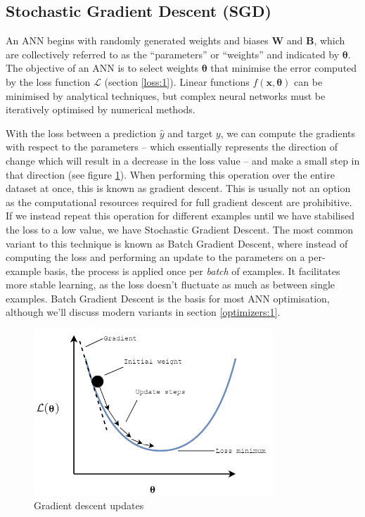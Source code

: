 \documentclass{report}
\begin{document}
\subsection{Stochastic Gradient Descent (SGD)} \label{sgd:1}
An ANN begins with randomly generated weights and biases $\bm{W}$ and $\bm{B}$, which are collectively referred to as the ``parameters'' or ``weights'' and indicated by $\bm{\theta}$. The objective of an ANN is to select weights $\bm{\theta}$ that minimise the error computed by the loss function $\mathcal{L}$ (section \ref{loss:1}). Linear functions $f(\bm{x}, \bm{\theta})$ can be minimised by analytical techniques, but complex neural networks must be iteratively optimised by numerical methods. \par
With the loss between a prediction $\hat{y}$ and target $y$, we can compute the gradients with respect to the parameters -- which essentially represents the direction of change which will result in a decrease in the loss value -- and make a small step in that direction (see figure \ref{fig:grad-descent:1}). When performing this operation over the entire dataset at once, this is known as gradient descent. This is usually not an option as the computational resources required for full gradient descent are prohibitive. If we instead repeat this operation for different examples until we have stabilised the loss to a low value, we have Stochastic Gradient Descent. The most common variant to this technique is known as Batch Gradient Descent, where instead of computing the loss and performing an update to the parameters on a per-example basis, the process is applied once per \textit{batch} of examples. It facilitates more stable learning, as the loss doesn't fluctuate as much as between single examples. Batch Gradient Descent is the basis for most ANN optimisation, although we'll discuss modern variants in section \ref{optimizers:1}. \par
\begin{figure}[h]
 \centering
 \includegraphics[width=9cm]{graddescent}
 \caption{Gradient descent updates}
 \label{fig:grad-descent:1}
\end{figure}
\end{document}
